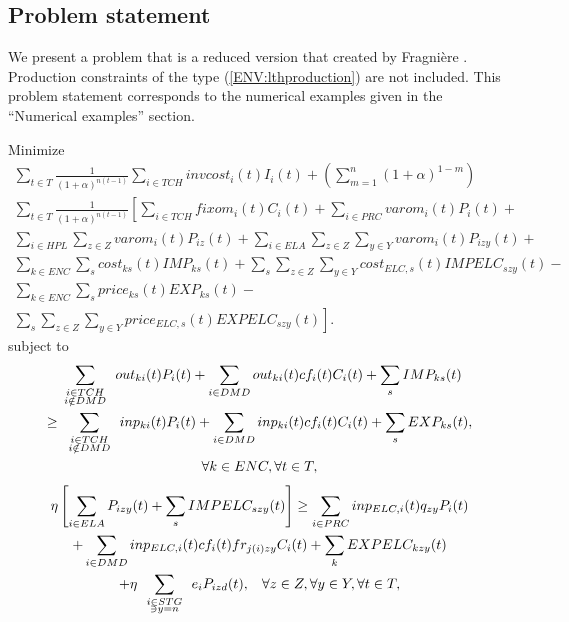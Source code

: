 \subsection{Problem statement}

We present a problem that is a reduced version that created by Fragni\`{e}re \cite{fragniere95}.  Production constraints of the type (\ref{ENV:lthproduction}) are not included.  This problem statement corresponds to the numerical examples given in the ``Numerical examples'' section. 

\hspace{0.5cm}


\noindent Minimize
\begin{multline*}
\sum_{t\in T} \frac{1}{(1+\alpha)^{n(t-1)}} \sum_{i\in TCH} invcost_i(t) I_i(t) + \left(\sum_{m=1}^n (1+\alpha)^{1-m}\right) \\
\sum_{t\in T} \frac{1}{(1+\alpha)^{n(t-1)}} \left[ \sum_{i\in TCH} fixom_i(t)C_i(t) + \sum_{i\in PRC} varom_i(t)P_i(t) + \right.\\
\sum_{i\in HPL} \sum_{z\in Z} varom_i(t) P_{iz}(t) + \sum_{i\in ELA} \sum_{z\in Z} \sum_{y \in Y} varom_i(t) P_{izy}(t) + \\
\sum_{k\in ENC} \sum_{s} cost_{ks}(t) IMP_{ks}(t) + \sum_s \sum_{z\in Z} \sum_{y\in Y} cost_{ELC,s}(t) IMPELC_{szy}(t) -\\
 \sum_{k\in ENC} \sum_{s} price_{ks}(t) EXP_{ks}(t) -\\
\left. \sum_s \sum_{z\in Z} \sum_{y \in Y} price_{ELC,s}(t) EXPELC_{szy}(t) \right].
\end{multline*}
subject to
\begin{multline*}
\sum_{{\renewcommand{\arraystretch}{0.2} \begin{array}{c} \scriptstyle i\in TCH \\ \scriptstyle i\notin DMD \end{array}}} out_{ki}(t)P_i(t) + \sum_{i\in DMD} out_{ki}(t)cf_i(t) C_i(t) + \sum_s IMP_{ks}(t)\\
 \geq \sum_{{\renewcommand{\arraystretch}{0.2} \begin{array}{c} \scriptstyle i\in TCH \\ \scriptstyle i\notin DMD \end{array}}} inp_{ki}(t)P_i(t) + \sum_{i\in DMD} inp_{ki}(t)cf_i(t) C_i(t) + \sum_s EXP_{ks}(t),\\
\forall k\in ENC, \forall t\in T,
\end{multline*}
\begin{multline*}
\eta \left[ \sum_{i\in ELA} P_{izy}(t) + \sum_s IMPELC_{szy}(t)\right] \geq \sum_{i\in PRC} inp_{ELC,i}(t) q_{zy} P_i(t) \\
+ \sum_{i\in DMD} inp_{ELC,i}(t) cf_i(t) fr_{j(i)zy} C_i(t) 
+ \sum_k EXPELC_{kzy}(t) \\
+ \eta \sum_{{\renewcommand{\arraystretch}{0.2} \begin{array}{c} \scriptstyle i\in STG \\ \scriptstyle \ni y=n \end{array}}} e_i P_{izd}(t), \hspace{3mm} \forall z\in Z, \forall y\in Y, \forall t \in T,
\end{multline*}
